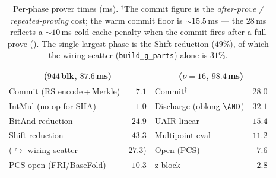 \begin{table}[t]
\centering
\renewcommand{\arraystretch}{1.2}
\begin{tabular}{@{}lr@{\quad}lr@{}}
\toprule
\multicolumn{2}{c}{\binius{} ($944$\,blk, $87.6$\,ms)} &
\multicolumn{2}{c}{\zinc{} ($\nu{=}16$, $98.4$\,ms)} \\
\midrule
Commit (RS encode\,+\,Merkle) & $7.1$  & Commit$^{\dagger}$       & $28.0$ \\
IntMul (no-op for SHA)        & $1.0$  & Discharge (oblong $\AND$) & $32.1$ \\
BitAnd reduction              & $24.9$ & UAIR-linear              & $15.4$ \\
Shift reduction               & $43.3$ & Multipoint-eval          & $11.2$ \\
\quad ($\hookrightarrow$ wiring scatter & $27.3$) & Open (PCS)    & $7.6$  \\
PCS open (FRI/BaseFold)       & $10.3$ & z-block                  & $2.8$  \\
\bottomrule
\end{tabular}
\caption{Per-phase prover times (ms). $^{\dagger}$The \zinc{} commit
figure is the \emph{after-prove / repeated-proving} cost; the warm
commit floor is $\sim$$15.5$\,ms --- the $28$\,ms reflects a $\sim$$10$\,ms
cold-cache penalty when the commit fires after a full prove
(). The single largest \binius{} phase is the Shift
reduction ($49\%$), of which the wiring scatter (\texttt{build\_g\_parts})
alone is $31\%$.}
\label{tab:phases}
\end{table}

